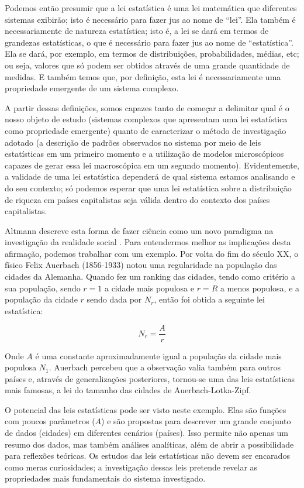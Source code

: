 Podemos então presumir que a lei estatística é uma lei matemática que diferentes sistemas exibirão; isto é necessário para fazer jus ao nome de ``lei''. Ela também é necessariamente de natureza estatística; isto é, a lei se dará em termos de grandezas estatísticas, o que é necessário para fazer jus ao nome de ``estatística''. Ela se dará, por exemplo, em termos de distribuições, probabilidades, médias, etc; ou seja, valores que só podem ser obtidos através de uma grande quantidade de medidas. E também temos que, por definição, esta lei é necessariamente uma propriedade emergente de um sistema complexo.

A partir dessas definições, somos capazes tanto de começar a delimitar qual é o nosso objeto de estudo (sistemas complexos que apresentam uma lei estatística como propriedade emergente) quanto de caracterizar o método de investigação adotado (a descrição de padrões observados no sistema por meio de leis estatísticas em um primeiro momento e a utilização de modelos microscópicos capazes de gerar essa lei macroscópica em um segundo momento). Evidentemente, a validade de uma lei estatística dependerá de qual sistema estamos analisando e do seu contexto; só podemos esperar que uma lei estatística sobre a distribuição de riqueza em países capitalistas  seja válida dentro do contexto dos países capitalistas. 

Altmann descreve esta forma de fazer ciência como um novo paradigma na investigação da realidade social \cite{Altmann_2024}. Para entendermos melhor as implicações desta afirmação, podemos trabalhar com um exemplo.  Por volta do fim do século XX, o físico Felix Auerbach (1856-1933) notou uma regularidade na população das cidades da Alemanha. Quando fez um ranking das cidades, tendo como critério a sua população, sendo  $r=1$  a cidade mais populosa e $r=R$ a menos populosa, e a população da cidade $r$  sendo  dada por $N_{r}$,  então foi obtida a seguinte lei estatística:

$$N_{r}=\frac{A}{r}$$

Onde $A$ é uma constante aproximadamente igual a população da cidade mais populosa $N_1$. Auerbach percebeu que a observação valia também para outros países e, através de generalizações posteriores, tornou-se uma das leis estatísticas mais famosas, a lei do tamanho das cidades de Auerbach-Lotka-Zipf.

O potencial das leis estatísticas pode ser visto neste exemplo. Elas são funções com poucos parâmetros ($A$) e são propostas para descrever um grande conjunto de dados (cidades) em diferentes cenários (países). Isso permite não apenas um resumo dos dados, mas também análises analíticas, além de abrir a possibilidade para reflexões teóricas. Os estudos das leis estatísticas não devem ser encarados como meras curiosidades; a investigação dessas leis pretende revelar as propriedades mais fundamentais do sistema investigado.


